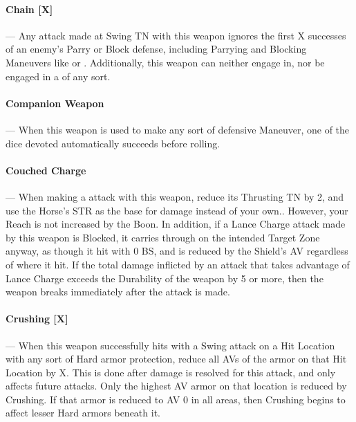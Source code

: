 \documentclass[oneside,11pt,english]{book}
\begin{document}
\vspace{-5pt}\paragraph[Chain]{\label{wepqual:Chain}Chain [X]}---\quad
Any attack made at Swing TN with this weapon ignores the first X successes of an enemy’s Parry or Block defense, including Parrying and Blocking Maneuvers like  or . Additionally, this weapon can neither engage in, nor be engaged in a  of any sort.

\vspace{-5pt}\paragraph{\label{wepqual:Companion Weapon}Companion Weapon}---\quad
When this weapon is used to make any sort of defensive Maneuver, one of the dice devoted automatically succeeds before rolling.

\vspace{-5pt}\paragraph{\label{wepqual:Couched Charge}Couched Charge}---\quad
When making a  attack with this weapon, reduce its Thrusting TN by 2, and use the Horse’s STR as the base for damage instead of your own.. However, your Reach is not increased by the  Boon. In addition, if a Lance Charge attack made by this weapon is Blocked, it carries through on the intended Target Zone anyway, as though it hit with 0 BS, and is reduced by the Shield’s AV regardless of where it hit. If the total damage inflicted by an attack that takes advantage of Lance Charge exceeds the Durability of the weapon by 5 or more, then the weapon breaks immediately after the attack is made.

\vspace{-5pt}\paragraph[Crushing]{\label{wepqual:Crushing}Crushing [X]}---\quad
When this weapon successfully hits with a Swing attack on a Hit Location with any sort of Hard armor protection, reduce all AVs of the armor on that Hit Location by X. This is done after damage is resolved for this attack, and only affects future attacks. Only the highest AV armor on that location is reduced by Crushing. If that armor is reduced to AV 0 in all areas, then Crushing begins to affect lesser Hard armors beneath it. 
\end{document}
